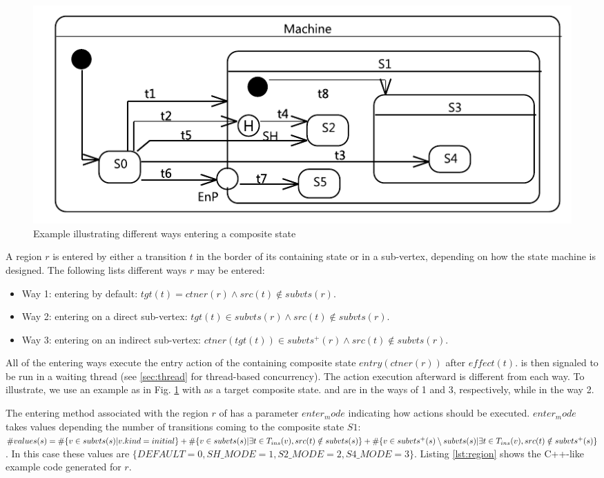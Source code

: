 \begin{figure}
	\centering
	\includegraphics[clip, trim=0.2cm 0.2cm 0.2cm 0.2cm, width=1.0\columnwidth]{figures/EnteringStateExample.pdf}
	\caption{Example illustrating different ways entering a composite state} 
	\label{fig:entering}
\end{figure}

A region $r$ is entered by either a transition $t$ in the border of its containing state or in a sub-vertex, depending on how the state machine is designed. 
The following lists different ways $r$ may be entered:
\begin{itemize}
	\item Way 1: entering by default: $tgt(t) = ctner(r) \wedge src(t) \notin subvts(r)$.
	
	\item Way 2: entering on a direct sub-vertex: $tgt(t) \in subvts(r) \wedge src(t) \notin subvts(r)$.
	
	\item Way 3: entering on an indirect sub-vertex: $ctner(tgt(t)) \in subvts^+(r) \wedge src(t) \notin subvts(r)$.
\end{itemize} 

All of the entering ways execute the entry action of the containing composite state $entry(ctner(r))$ after $effect(t)$.  is then signaled to be run in a waiting thread (see \ref{sec:thread} for thread-based concurrency). The action execution afterward is different from each way. To illustrate, we use an example as in Fig. \ref{fig:entering} with  as a target composite state.  and  are in the ways of 1 and 3, respectively, while  in the way 2. 

The entering method associated with the region $r$ of  has a parameter $enter_mode$ indicating how actions should be executed. $enter_mode$ takes values depending the number of transitions coming to the composite state $S1$: $\#values(s) = \\ \#\{v \in subvts(s)| v.kind=initial\} + \\ \#\{v \in subvts(s)| \exists t \in T_{ins}(v), src(t) \notin subvts(s)\} + \\ 
\#\{v \in subvts^+(s)\setminus subvts(s)|\exists t \in T_{ins}(v), src(t) \notin subvts^+(s)\}$. In this case these values are $\{DEFAULT = 0, SH\_MODE = 1, S2\_MODE = 2, S4\_MODE=3\}$. Listing \ref{lst:region} shows the C++-like example code generated for $r$.


